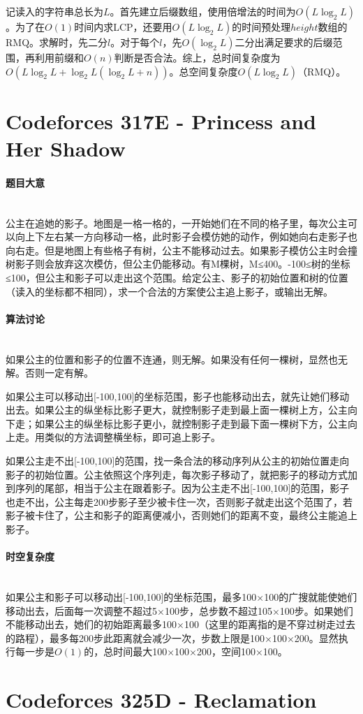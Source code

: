 \documentclass[UTF8]{ctexart}
\newcommand{\myparagraph}[1]{\paragraph{#1}\mbox{}\\}
\theoremstyle{nonumberplain}
\begin{document}
			记读入的字符串总长为$L$。首先建立后缀数组，使用倍增法的时间为$O(L\log_2L)$。为了在$O(1)$时间内求LCP，还要用$O(L\log_2L)$的时间预处理$height$数组的RMQ。求解时，先二分$l$。对于每个$l$，先$O(\log_2L)$二分出满足要求的后缀范围，再利用前缀和$O(n)$判断是否合法。综上，总时间复杂度为$O(L\log_2L+\log_2L(\log_2L+n))$。总空间复杂度$O(L\log_2L)$（RMQ）。
	
	\section{Codeforces 317E - Princess and Her Shadow}
	
		\myparagraph{题目大意}
		
			公主在追她的影子。地图是一格一格的，一开始她们在不同的格子里，每次公主可以向上下左右某一方向移动一格，此时影子会模仿她的动作，例如她向右走影子也向右走。但是地图上有些格子有树，公主不能移动过去。如果影子模仿公主时会撞树影子则会放弃这次模仿，但公主仍能移动。有M棵树，M≤400。-100≤树的坐标≤100，但公主和影子可以走出这个范围。给定公主、影子的初始位置和树的位置（读入的坐标都不相同），求一个合法的方案使公主追上影子，或输出无解。
		
		\myparagraph{算法讨论}
			
			如果公主的位置和影子的位置不连通，则无解。如果没有任何一棵树，显然也无解。否则一定有解。
			
			如果公主可以移动出[-100,100]的坐标范围，影子也能移动出去，就先让她们移动出去。如果公主的纵坐标比影子更大，就控制影子走到最上面一棵树上方，公主向下走；如果公主的纵坐标比影子更小，就控制影子走到最下面一棵树下方，公主向上走。用类似的方法调整横坐标，即可追上影子。
			
			如果公主走不出[-100,100]的范围，找一条合法的移动序列从公主的初始位置走向影子的初始位置。公主依照这个序列走，每次影子移动了，就把影子的移动方式加到序列的尾部，相当于公主在跟着影子。因为公主走不出[-100,100]的范围，影子也走不出，公主每走200步影子至少被卡住一次，否则影子就走出这个范围了，若影子被卡住了，公主和影子的距离便减小，否则她们的距离不变，最终公主能追上影子。
			
		\myparagraph{时空复杂度}
			
			如果公主和影子可以移动出[-100,100]的坐标范围，最多100×100的广搜就能使她们移动出去，后面每一次调整不超过5×100步，总步数不超过105×100步。如果她们不能移动出去，她们的初始距离最多100×100（这里的距离指的是不穿过树走过去的路程），最多每200步此距离就会减少一次，步数上限是100×100×200。显然执行每一步是$O(1)$的，总时间最大100×100×200，空间100×100。
	
	\section{Codeforces 325D - Reclamation}
		
\end{document}
